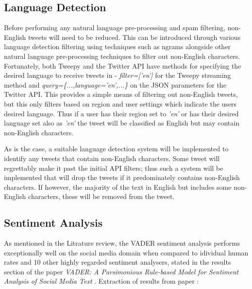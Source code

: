 \documentclass[oneside, 12pt]{article}
\begin{document}
		
		\subsection{Language Detection}
		Before performing any natural language pre-processing and spam filtering, non-English tweets will need to be reduced. This can be introduced through various language detection filtering using techniques such as ngrams alongside other natural language pre-processing techniques to filter out non-English characters. Fortunately, both Tweepy and the Twitter API have methods for specifying the desired language to receive tweets in - \textit{filter=['en']} for the Tweepy streaming method and \textit{query=\{...,language='en',...\}} on the JSON parameters for the Twitter API. This provides a simple means of filtering out non-English tweets, but this only filters based on region and user settings which indicate the users desired language. Thus if a user has their region set to \textit{'en'} or has their desired language set also as \textit{'en'} the tweet will be classified as English but may contain non-English characters. 
		
		As is the case, a suitable language detection system will be implemented to identify any tweets that contain non-English characters. Some tweet will regrettably make it past the initial API filters; thus such a system will be implemented that will drop the tweets if it predominately contains non-English characters. If however, the majority of the text in English but includes some non-English characters, these will be removed from the tweet.
		
		\subsection{Sentiment Analysis}
		As mentioned in the Litrature review, the VADER sentiment analysis performs exceptionally well on the social media domain when compared to idividual human rates and 10 other highly regarded sentiment analysers, stated in the results section of the paper \textit{VADER: A Parsimonious Rule-based Model for Sentiment Analysis of Social Media Text} \cite{VADERPaper}. \newline Extraction of results from paper \cite{VADERPaper}:
\end{document}
